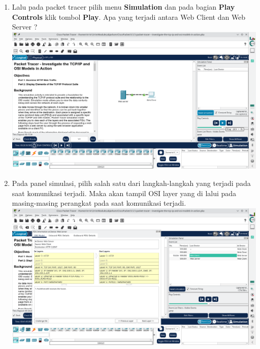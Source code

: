 \documentclass{article}
\begin{document}
\begin{flushleft}
\begin{enumerate}
            \item Lalu pada packet tracer pilih menu \textbf{Simulation} dan pada bagian \textbf{Play Controls} klik tombol \textbf{Play}. Apa yang terjadi antara Web Client dan Web Server ?
            \includegraphics[scale=0.3]{2-play-simulation.png}
            \newline

            \item Pada panel simulasi, pilih salah satu dari langkah-langkah yang terjadi pada saat komunikasi terjadi. Maka akan tampil OSI layer yang di lalui pada masing-masing perangkat pada saat komunikasi terjadi.
            \includegraphics[scale=0.3]{2-osi-layer-sim.png}
        \end{enumerate}
    \end{flushleft}
\end{document}
